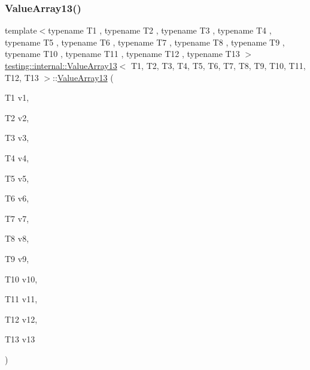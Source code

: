 \subsubsection{\texorpdfstring{ValueArray13()}{ValueArray13()}\hspace{0.1cm}{\footnotesize\ttfamily [1/2]}}
{\footnotesize\ttfamily template$<$typename T1 , typename T2 , typename T3 , typename T4 , typename T5 , typename T6 , typename T7 , typename T8 , typename T9 , typename T10 , typename T11 , typename T12 , typename T13 $>$ \\
\mbox{\hyperlink{classtesting_1_1internal_1_1_value_array13}{testing\+::internal\+::\+Value\+Array13}}$<$ T1, T2, T3, T4, T5, T6, T7, T8, T9, T10, T11, T12, T13 $>$\+::\mbox{\hyperlink{classtesting_1_1internal_1_1_value_array13}{Value\+Array13}} (\begin{DoxyParamCaption}\item[{T1}]{v1,  }\item[{T2}]{v2,  }\item[{T3}]{v3,  }\item[{T4}]{v4,  }\item[{T5}]{v5,  }\item[{T6}]{v6,  }\item[{T7}]{v7,  }\item[{T8}]{v8,  }\item[{T9}]{v9,  }\item[{T10}]{v10,  }\item[{T11}]{v11,  }\item[{T12}]{v12,  }\item[{T13}]{v13 }\end{DoxyParamCaption})\hspace{0.3cm}{\ttfamily [inline]}}

\mbox{\label{classtesting_1_1internal_1_1_value_array13_a150575c5629d3a589bf2baba0371b1da}} 
